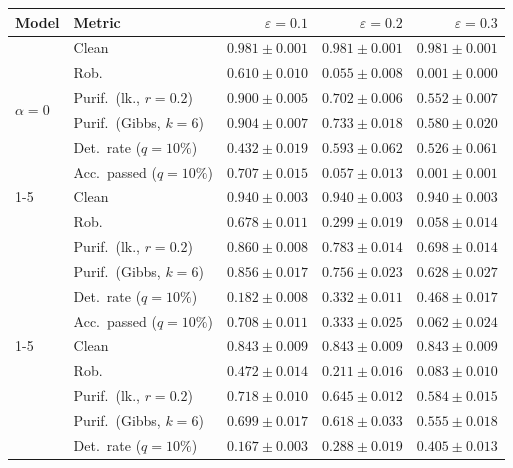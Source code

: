 \begin{table}[htbp]
  \centering
  \small
  \begin{tabular}{@{}llrrr@{}}
    \toprule
    Model & Metric & $\varepsilon=0.1$ & $\varepsilon=0.2$ & $\varepsilon=0.3$ \\
    \midrule
    \multirow{6}{*}{$\alpha{=}0$} & Clean & $\mathbf{0.981 \pm 0.001}$ & $\mathbf{0.981 \pm 0.001}$ & $\mathbf{0.981 \pm 0.001}$ \\
     & Rob. & $0.610 \pm 0.010$ & $0.055 \pm 0.008$ & $0.001 \pm 0.000$ \\
     & Purif.\ (lk., $r{=}0.2$) & $0.900 \pm 0.005$ & $0.702 \pm 0.006$ & $0.552 \pm 0.007$ \\
     & Purif.\ (Gibbs, $k{=}6$) & $0.904 \pm 0.007$ & $0.733 \pm 0.018$ & $0.580 \pm 0.020$ \\
     & Det.\ rate ($q{=}10\%$) & $\mathbf{0.432 \pm 0.019}$ & $\mathbf{0.593 \pm 0.062}$ & $\mathbf{0.526 \pm 0.061}$ \\
     & Acc.\ passed ($q{=}10\%$) & $0.707 \pm 0.015$ & $0.057 \pm 0.013$ & $0.001 \pm 0.001$ \\
    \cmidrule(lr){1-5}
    \multirow{6}{*}{$\alpha{=}0.01$} & Clean & $0.940 \pm 0.003$ & $0.940 \pm 0.003$ & $0.940 \pm 0.003$ \\
     & Rob. & $0.678 \pm 0.011$ & $0.299 \pm 0.019$ & $0.058 \pm 0.014$ \\
     & Purif.\ (lk., $r{=}0.2$) & $0.860 \pm 0.008$ & $0.783 \pm 0.014$ & $0.698 \pm 0.014$ \\
     & Purif.\ (Gibbs, $k{=}6$) & $0.856 \pm 0.017$ & $0.756 \pm 0.023$ & $0.628 \pm 0.027$ \\
     & Det.\ rate ($q{=}10\%$) & $0.182 \pm 0.008$ & $0.332 \pm 0.011$ & $0.468 \pm 0.017$ \\
     & Acc.\ passed ($q{=}10\%$) & $0.708 \pm 0.011$ & $0.333 \pm 0.025$ & $0.062 \pm 0.024$ \\
    \cmidrule(lr){1-5}
    \multirow{6}{*}{$\alpha{=}0.1$} & Clean & $0.843 \pm 0.009$ & $0.843 \pm 0.009$ & $0.843 \pm 0.009$ \\
     & Rob. & $0.472 \pm 0.014$ & $0.211 \pm 0.016$ & $0.083 \pm 0.010$ \\
     & Purif.\ (lk., $r{=}0.2$) & $0.718 \pm 0.010$ & $0.645 \pm 0.012$ & $0.584 \pm 0.015$ \\
     & Purif.\ (Gibbs, $k{=}6$) & $0.699 \pm 0.017$ & $0.618 \pm 0.033$ & $0.555 \pm 0.018$ \\
     & Det.\ rate ($q{=}10\%$) & $0.167 \pm 0.003$ & $0.288 \pm 0.019$ & $0.405 \pm 0.013$ \\

\end{tabular}
\end{table}

